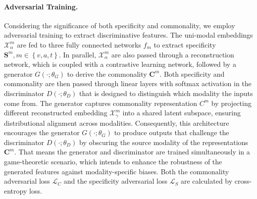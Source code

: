 \paragraph{Adversarial Training.} Considering the significance of both specificity and commonality, we employ adversarial training to extract discriminative features. The uni-modal embeddings $\bm{\mathcal X}_{\alpha}^{m}$ are fed to three fully connected networks $f_m$ to extract specificity $\bm{S}^{m}, m \in \left\{ v, a, t\right\}$. In parallel, $\bm{\mathcal X}_{\alpha}^{m}$ are also passed through a reconstruction network, which is coupled with a contrastive learning network, followed by a generator $ G\left ( \cdot;\theta_{G} \right )$ to derive the commonality $\bm{C}^{m}$. Both specificity and commonality are then passed through linear layers with softmax activation in the discriminator $ D\left ( \cdot;\theta_{D} \right )$ that is designed to distinguish which modality the inputs come from. The generator captures commonality representation ${C}^{m}$ by projecting different reconstructed embedding $\bm{\mathcal{X}}_{\gamma }^{m}$ into a shared latent subspace, ensuring distributional alignment across modalities.
%
Consequently, this architecture encourages the generator $G(\cdot; \theta_{G})$ to produce outputs that challenge the discriminator $ D\left ( \cdot;\theta_{D} \right )$ by obscuring the source modality of the representations $\bm{C}^{m}$. That means the generator and discriminator are trained simultaneously in a game-theoretic scenario, which intends to enhance the robustness of the generated features against modality-specific biases. Both the commonality adversarial loss $\mathcal{L}_C$ and the specificity adversarial loss $\mathcal{L}_S$ are calculated by cross-entropy loss.
%

